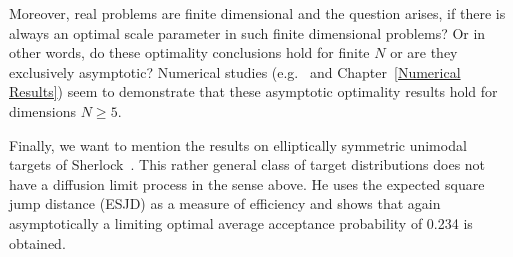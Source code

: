 Moreover, real problems are finite dimensional and the question arises, if there is always an optimal scale parameter in such finite dimensional problems? Or in other words, do these optimality conclusions hold for finite $N$ or are they exclusively asymptotic? Numerical studies (e.g.~\autocite{Gelman1996, Roberts2001} and Chapter~\ref{Numerical Results}) seem to demonstrate that these asymptotic optimality results hold for dimensions $N \geq 5 $. 

Finally, we want to mention the results on elliptically symmetric unimodal targets of Sherlock~\autocite{Sherlock2006}. This rather general class of target distributions does not have a diffusion limit process in the sense above. He uses the expected square jump distance (ESJD) as a measure of efficiency and shows that again asymptotically a limiting optimal average acceptance probability of 0.234 is obtained.



